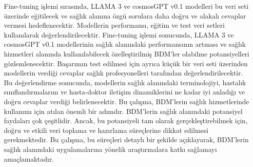 \linebreak
Fine-tuning işlemi sırasında, LLAMA 3 ve cosmosGPT v0.1 modelleri bu veri seti üzerinde eğitilecek ve sağlık alanına özgü sorulara daha doğru ve alakalı cevaplar vermesi hedeflenecektir. Modellerin performansı, eğitim ve test veri setleri kullanılarak değerlendirilecektir. Fine-tuning işlemi sonucunda, LLAMA 3 ve cosmosGPT v0.1 modellerinin sağlık alanındaki performansının artması ve sağlık hizmetleri alanında kullanılabilecek özelleştirilmiş BDM'ler olabilme potansiyelleri gözlemlenecektir.
\linebreak
Başarımın test edilmesi için ayrıca küçük bir veri seti üzerinden modellerin verdiği cevaplar sağlık profesyonelleri tarafından değerlendirilecektir. Bu değerlendirme sonucunda, modellerin sağlık alanındaki terminolojiyi, hastalık sınıflandırmalarını ve hasta-doktor iletişim dinamiklerini ne kadar iyi anladığı ve doğru cevaplar verdiği belirlenecektir.
\linebreak
Bu çalışma, BDM'lerin sağlık hizmetlerinde kullanımı için atılan önemli bir adımdır. BDM'lerin sağlık alanındaki potansiyel faydaları çok çeşitlidir. Ancak, bu potansiyeli tam olarak gerçekleştirebilmek için, doğru ve etkili veri toplama ve hazırlama süreçlerine dikkat edilmesi gerekmektedir. Bu çalışma, bu süreçleri detaylı bir şekilde açıklayarak, BDM'lerin sağlık alanındaki uygulamalarına yönelik araştırmalara katkı sağlamayı amaçlamaktadır.